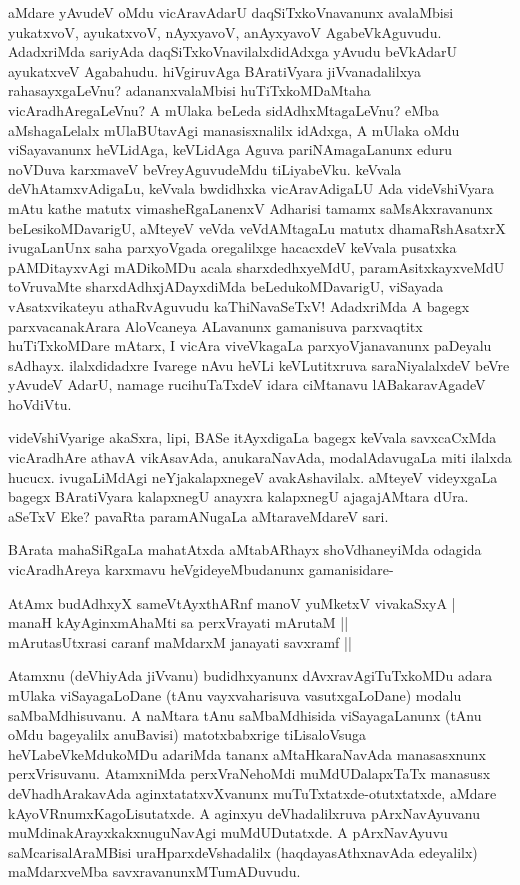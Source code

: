 aMdare yAvudeV oMdu vicAravAdarU daqSiTxkoVnavanunx avalaMbisi yukatxvoV, ayukatxvoV, nAyxyavoV, anAyxyavoV AgabeVkAguvudu. AdadxriMda sariyAda daqSiTxkoVnavilalxdidAdxga yAvudu beVkAdarU ayukatxveV Agabahudu. hiVgiruvAga BAratiVyara jiVvanadalilxya rahasayxgaLeVnu? adananxvalaMbisi huTiTxkoMDaMtaha vicAradhAregaLeVnu? A mUlaka beLeda sidAdhxMtagaLeVnu? eMba aMshagaLelalx mUlaBUtavAgi manasisxnalilx idAdxga, A mUlaka oMdu viSayavanunx heVLidAga, keVLidAga Aguva pariNAmagaLanunx eduru noVDuva karxmaveV beVreyAguvudeMdu tiLiyabeVku. keVvala deVhAtamxvAdigaLu, keVvala bwdidhxka vicAravAdigaLU Ada videVshiVyara mAtu kathe matutx vimasheRgaLanenxV Adharisi tamamx saMsAkxravanunx beLesikoMDavarigU, aMteyeV veVda veVdAMtagaLu matutx dhamaRshAsatxrX ivugaLanUnx saha parxyoVgada oregalilxge hacacxdeV keVvala pusatxka pAMDitayxvAgi mADikoMDu acala sharxdedhxyeMdU, paramAsitxkayxveMdU toVruvaMte sharxdAdhxjADayxdiMda beLedukoMDavarigU, viSayada vAsatxvikateyu athaRvAguvudu kaThiNavaSeTxV! AdadxriMda A bagegx parxvacanakArara AloVcaneya ALavanunx gamanisuva parxvaqtitx huTiTxkoMDare mAtarx, I vicAra viveVkagaLa parxyoVjanavanunx paDeyalu sAdhayx. ilalxdidadxre Ivarege nAvu heVLi keVLutitxruva saraNiyalalxdeV beVre yAvudeV AdarU, namage rucihuTaTxdeV idara ciMtanavu lABakaravAgadeV hoVdiVtu.

videVshiVyarige akaSxra, lipi, BASe itAyxdigaLa bagegx keVvala savxcaCxMda vicAradhAre athavA vikAsavAda, anukaraNavAda, modalAdavugaLa miti ilalxda hucucx. ivugaLiMdAgi neYjakalapxnegeV avakAshavilalx. aMteyeV videyxgaLa bagegx BAratiVyara kalapxnegU anayxra kalapxnegU ajagajAMtara dUra. aSeTxV Eke? pavaRta paramANugaLa aMtaraveMdareV sari.

BArata mahaSiRgaLa mahatAtxda aMtabARhayx shoVdhaneyiMda odagida vicAradhAreya karxmavu heVgideyeMbudanunx gamanisidare-

\begin{shloka}
AtAmx budAdhxyX sameVtAyxthARnf manoV yuMketxV vivakaSxyA |\\
manaH kAyAginxmAhaMti sa perxVrayati mArutaM ||\\
mArutasUtxrasi caranf maMdarxM janayati savxramf ||\\
\end{shloka}

Atamxnu (deVhiyAda jiVvanu) budidhxyanunx dAvxravAgiTuTxkoMDu adara \hbox{mUlaka} viSayagaLoDane (tAnu vayxvaharisuva vasutxgaLoDane) modalu saMbaMdhisuvanu. A naMtara tAnu saMbaMdhisida viSayagaLanunx (tAnu oMdu bageyalilx anuBavisi) matotxbabxrige tiLisaloVsuga heVLabeVkeMdukoMDu adariMda tananx aMtaHkaraNavAda manasasxnunx perxVrisuvanu. AtamxniMda perxVraNehoMdi muMdUDalapxTaTx manasusx deVhadhArakavAda aginxtatatxvXvanunx muTuTxtatxde-otutxtatxde, aMdare kAyoVRnumxKagoLisutatxde. A aginxyu deVhadalilxruva pArxNavAyuvanu muMdinakArayxkakxnuguNavAgi muMdUDutatxde. A pArxNavAyuvu saMcarisalAraMBisi uraHparxdeVshadalilx (haqdayasAthxnavAda edeyalilx) maMdarxveMba savxravanunxMTumADuvudu.

